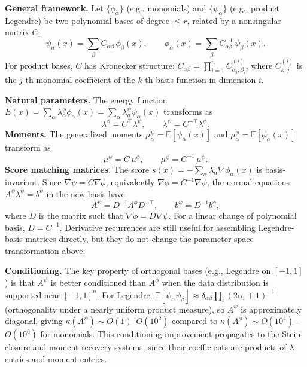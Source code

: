 \documentclass{article}
\newcommand{\E}{\mathbb{E}}
\theoremstyle{definition}
\begin{document}
\textbf{General framework.}
Let $\{\phi_\alpha\}$ (e.g., monomials) and $\{\psi_\alpha\}$
(e.g., product Legendre) be two polynomial bases of degree $\le r$,
related by a nonsingular matrix $C$:
\begin{equation}
    \psi_\alpha(x) = \sum_\beta C_{\alpha\beta}\, \phi_\beta(x),
    \qquad
    \phi_\alpha(x) = \sum_\beta C^{-1}_{\alpha\beta}\, \psi_\beta(x).
\end{equation}
For product bases, $C$ has Kronecker structure:
$C_{\alpha\beta} = \prod_{i=1}^n C^{(i)}_{\alpha_i, \beta_i}$,
where $C^{(i)}_{k,j}$ is the $j$-th monomial coefficient of
the $k$-th basis function in dimension $i$.

\textbf{Natural parameters.}
The energy function $E(x) = \sum_\alpha \lambda^\phi_\alpha \phi_\alpha(x)
= \sum_\alpha \lambda^\psi_\alpha \psi_\alpha(x)$ transforms as
\begin{equation}
    \lambda^\phi = C^\top \lambda^\psi,
    \qquad
    \lambda^\psi = C^{-\top} \lambda^\phi.
    \label{eq:lambda-change}
\end{equation}
\textbf{Moments.}
The generalized moments $\mu^\psi_\alpha = \E[\psi_\alpha(x)]$
and $\mu^\phi_\alpha = \E[\phi_\alpha(x)]$ transform as
\begin{equation}
    \mu^\psi = C\, \mu^\phi, \qquad \mu^\phi = C^{-1}\, \mu^\psi.
    \label{eq:moment-change}
\end{equation}
\textbf{Score matching matrices.}
The score $s(x) = -\sum_\alpha \lambda_\alpha \nabla\phi_\alpha(x)$
is basis-invariant. Since $\nabla\psi = C\nabla\phi$, equivalently
$\nabla\phi = C^{-1}\nabla\psi$, the normal equations
$A^\psi \lambda^\psi = b^\psi$ in the new basis have
\begin{equation}
    A^\psi = D^{-1} A^\phi D^{-\top}, \qquad b^\psi = D^{-1} b^\phi,
    \label{eq:Ab-change}
\end{equation}
where $D$ is the matrix such that
$\nabla \phi = D \nabla \psi$. For a linear change of polynomial basis,
$D=C^{-1}$. Derivative recurrences are still useful for assembling
Legendre-basis matrices directly, but they do not change the
parameter-space transformation above.

\textbf{Conditioning.}
The key property of orthogonal bases (e.g., Legendre on $[-1,1]$)
is that $A^\psi$ is better conditioned than $A^\phi$ when the
data distribution is supported near $[-1,1]^n$.
For Legendre, $\E[\psi_\alpha \psi_\beta] \approx \delta_{\alpha\beta}
\prod_i (2\alpha_i+1)^{-1}$ (orthogonality under a nearly uniform
product measure), so $A^\psi$
is approximately diagonal, giving $\kappa(A^\psi) \sim O(1)$--$O(10^2)$
compared to $\kappa(A^\phi) \sim O(10^4)$--$O(10^6)$ for monomials.
This conditioning improvement propagates to the Stein closure and
moment recovery systems, since their coefficients are
products of $\lambda$ entries and moment entries.
\end{document}
